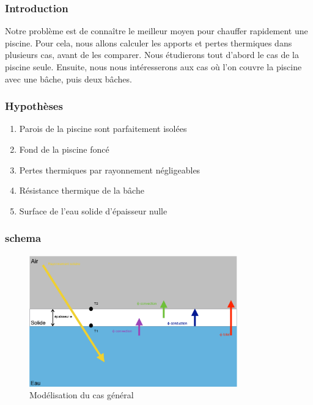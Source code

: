 \documentclass{beamer}
\begin{document}
  \begin{frame}
    \frametitle{Introduction}
    Notre problème est de connaître le meilleur moyen pour chauffer rapidement une piscine. Pour cela, nous allons calculer les apports et pertes thermiques dans plusieurs cas, avant de les comparer. Nous étudierons tout d’abord le cas de la piscine seule. Ensuite, nous nous intéresserons aux cas où l’on couvre la piscine avec une bâche, puis deux bâches.
  \end{frame}
  \begin{frame}
   \frametitle{Hypothèses}
   \begin{enumerate}
    \item Parois de la piscine sont parfaitement isolées
    \item Fond de la piscine foncé
    \item Pertes thermiques par rayonnement négligeables
    \item Résistance thermique de la bâche
    \item Surface de l’eau solide d’épaisseur nulle
   \end{enumerate}



 






  \end{frame}
  \begin{frame}
   \frametitle{schema}
   \begin{figure}[ht!]
    \centering
    \includegraphics[width=90mm]{thermo.png}
    \caption{Mod\'{e}lisation du cas g\'{e}n\'{e}ral \label{overflow}}
   \end{figure}
  \end{frame}
\end{document}
